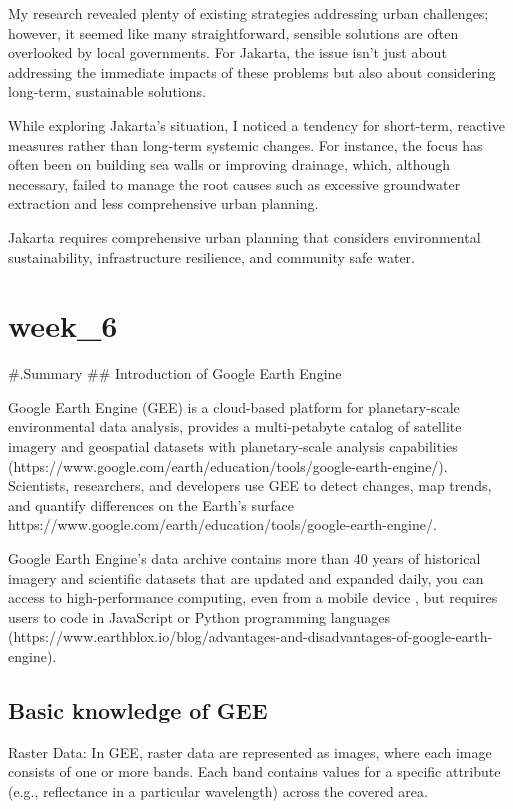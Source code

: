 \documentclass[
  letterpaper,
  DIV=11,
  numbers=noendperiod]{scrreprt}
\begin{document}
My research revealed plenty of existing strategies addressing urban
challenges; however, it seemed like many straightforward, sensible
solutions are often overlooked by local governments. For Jakarta, the
issue isn't just about addressing the immediate impacts of these
problems but also about considering long-term, sustainable solutions.

While exploring Jakarta's situation, I noticed a tendency for
short-term, reactive measures rather than long-term systemic changes.
For instance, the focus has often been on building sea walls or
improving drainage, which, although necessary, failed to manage the root
causes such as excessive groundwater extraction and less comprehensive
urban planning.

Jakarta requires comprehensive urban planning that considers
environmental sustainability, infrastructure resilience, and community
safe water.


\chapter{week\_6}\label{week_6}

\#.Summary \#\# Introduction of Google Earth Engine

Google Earth Engine (GEE) is a cloud-based platform for planetary-scale
environmental data analysis, provides a multi-petabyte catalog of
satellite imagery and geospatial datasets with planetary-scale analysis
capabilities
(https://www.google.com/earth/education/tools/google-earth-engine/).
Scientists, researchers, and developers use GEE to detect changes, map
trends, and quantify differences on the Earth's surface
https://www.google.com/earth/education/tools/google-earth-engine/.

Google Earth Engine's data archive contains more than 40 years of
historical imagery and scientific datasets that are updated and expanded
daily, you can access to high-performance computing, even from a mobile
device , but requires users to code in JavaScript or Python programming
languages
(https://www.earthblox.io/blog/advantages-and-disadvantages-of-google-earth-engine).

\section{Basic knowledge of GEE}\label{basic-knowledge-of-gee}

Raster Data: In GEE, raster data are represented as images, where each
image consists of one or more bands. Each band contains values for a
specific attribute (e.g., reflectance in a particular wavelength) across
the covered area.
\end{document}
